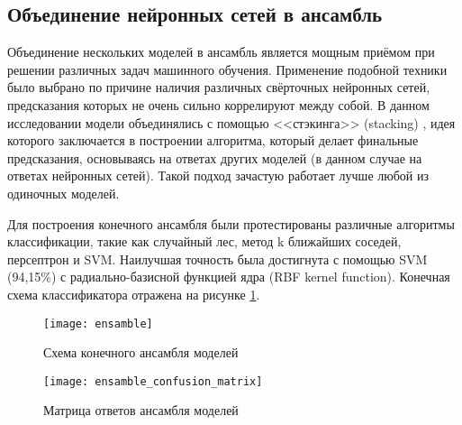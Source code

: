 \subsection{Объединение нейронных сетей в ансамбль}
Объединение нескольких моделей в ансамбль является мощным приёмом при решении различных задач машинного обучения.
Применение подобной техники было выбрано по причине наличия различных свёрточных нейронных сетей, предсказания которых
не очень сильно коррелируют между собой. В данном исследовании модели объединялись с помощью <<стэкинга>> (stacking)
\cite{Wolpert92stackedgeneralization}, идея которого заключается в построении алгоритма, который делает финальные 
предсказания, основываясь на ответах других моделей (в данном случае на ответах нейронных сетей). Такой подход зачастую
работает лучше любой из одиночных моделей.

Для построения конечного ансамбля были протестированы различные алгоритмы классификации, такие как случайный лес, 
метод k ближайших соседей, персептрон и SVM. Наилучшая точность была достигнута с помощью SVM (94,15\%) с радиально-базисной
функцией ядра (RBF kernel function). Конечная схема классификатора отражена на рисунке \ref{fig:ansamble}.

\begin{figure}[H]
    \centering
    \texttt{[image: ensamble]}
    \caption{Схема конечного ансамбля моделей}
    \label{fig:ansamble}
\end{figure}

\begin{figure}[H]
    \centering
    \texttt{[image: ensamble\_confusion\_matrix]}
    \vspace*{-0.5cm}
    \caption{Матрица ответов ансамбля моделей}
    \label{fig:ensamble_confusion_matrix}
\end{figure}